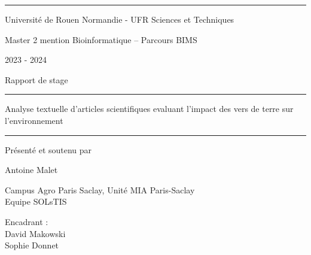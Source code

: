 \documentclass{book}
\begin{document}
\vspace{0.5cm}
\hrule
\vspace{0.5cm}

\begin{center}
    \large{Université de Rouen Normandie - UFR Sciences et Techniques}
\end{center}

\begin{center}
    \large{Master 2 mention Bioinformatique – Parcours BIMS}
\end{center}

\begin{center}
    \large{2023 - 2024}
\end{center}

\vspace{1cm}

\begin{center}
    \Large{Rapport de stage}
\end{center}

\begin{center}
    \vspace{1cm}
    \hrule
    \vspace{1cm}
    \huge{Analyse textuelle d'articles scientifiques evaluant l'impact des vers
        de terre sur l'environnement}
    \vspace{1cm}
    \hrule
    \vspace{1cm}
\end{center}

\begin{center}
    \large{Présenté et soutenu par}
\end{center}

\begin{center}
    \huge{Antoine Malet}
\end{center}

\begin{center}
    \vspace{1.5cm}
    \Large{Campus Agro Paris Saclay, Unité MIA Paris-Saclay} \\
    \Large{Equipe SOLsTIS}
\end{center}

\begin{center}
    \vspace{0.5cm}
    \large{Encadrant :} \\
    \vspace{0.5cm}
    \large{David Makowski} \\
    \large{Sophie Donnet}
\end{center}
\end{document}
